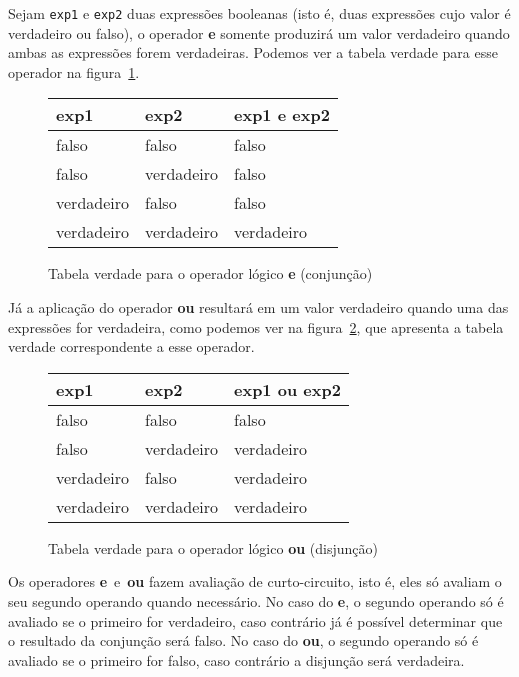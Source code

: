 \documentclass{report}
\begin{document}
Sejam \texttt{exp1} e \texttt{exp2} duas expressões booleanas (isto é,
duas expressões cujo valor é verdadeiro ou falso), o operador \textbf{e}
somente produzirá um valor verdadeiro quando ambas as expressões forem
verdadeiras. Podemos ver a tabela verdade para esse operador na
figura~\ref{tab:ope}.

\begin{figure}
\centering
\begin{tabular}{|l|l|l|}
\hline
exp1 & exp2 & exp1 {\bf e} exp2 \\ \hline
falso & falso & falso \\ \hline
falso & verdadeiro & falso \\ \hline
verdadeiro & falso & falso \\ \hline
verdadeiro & verdadeiro & verdadeiro \\ \hline
\end{tabular}
\caption{Tabela verdade para o operador lógico {\bf e} (conjunção)}
\label{tab:ope}
\end{figure}

Já a aplicação do operador \textbf{ou} resultará em um
valor verdadeiro quando uma das expressões for verdadeira,
como podemos ver na figura~\ref{tab:opou}, que apresenta
a tabela verdade correspondente a esse operador.

\begin{figure}
\centering
\begin{tabular}{|l|l|l|}
\hline
exp1 & exp2 & exp1 {\bf ou} exp2 \\ \hline
falso & falso & falso \\ \hline
falso & verdadeiro & verdadeiro \\ \hline
verdadeiro & falso & verdadeiro \\ \hline
verdadeiro & verdadeiro & verdadeiro \\ \hline
\end{tabular}
\caption{Tabela verdade para o operador lógico {\bf ou} (disjunção)}
\label{tab:opou}
\end{figure}

Os operadores \textbf{e} \,e\, \textbf{ou} fazem avaliação
de curto-circuito, isto é, eles só avaliam o seu segundo
operando quando necessário. No caso do \textbf{e}, o
segundo operando só é avaliado se o primeiro for verdadeiro,
caso contrário já é possível determinar que o resultado
da conjunção será falso. No caso do \textbf{ou}, o
segundo operando só é avaliado se o primeiro for falso,
caso contrário a disjunção será verdadeira.
\end{document}
